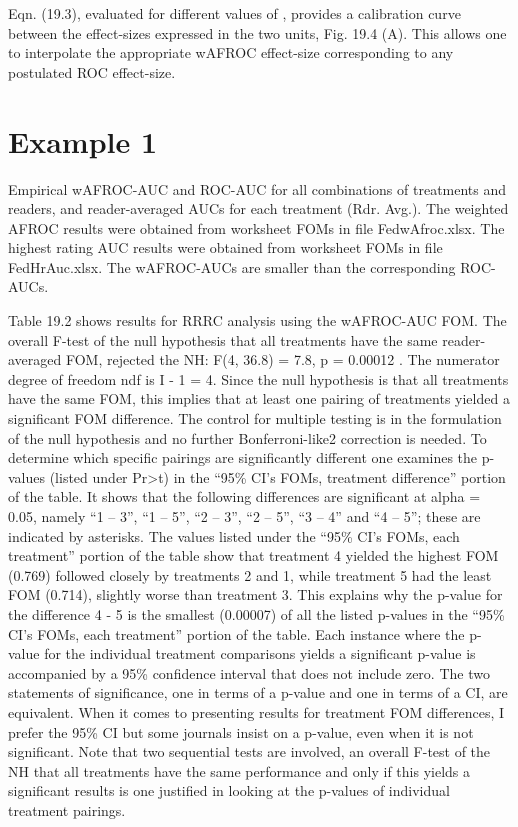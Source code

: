 \documentclass[
]{book}
\begin{document}
Eqn. (19.3), evaluated for different values of , provides a calibration curve between the effect-sizes expressed in the two units, Fig. 19.4 (A). This allows one to interpolate the appropriate wAFROC effect-size corresponding to any postulated ROC effect-size.

\hypertarget{froc-sample-size-example1}{%
\section{Example 1}\label{froc-sample-size-example1}}

Empirical wAFROC-AUC and ROC-AUC for all combinations of treatments and readers, and reader-averaged AUCs for each treatment (Rdr. Avg.). The weighted AFROC results were obtained from worksheet FOMs in file FedwAfroc.xlsx. The highest rating AUC results were obtained from worksheet FOMs in file FedHrAuc.xlsx. The wAFROC-AUCs are smaller than the corresponding ROC-AUCs.

Table 19.2 shows results for RRRC analysis using the wAFROC-AUC FOM. The overall F-test of the null hypothesis that all treatments have the same reader-averaged FOM, rejected the NH: F(4, 36.8) = 7.8, p = 0.00012 . The numerator degree of freedom ndf is I - 1 = 4. Since the null hypothesis is that all treatments have the same FOM, this implies that at least one pairing of treatments yielded a significant FOM difference. The control for multiple testing is in the formulation of the null hypothesis and no further Bonferroni-like2 correction is needed. To determine which specific pairings are significantly different one examines the p-values (listed under Pr\textgreater t) in the ``95\% CI's FOMs, treatment difference'' portion of the table. It shows that the following differences are significant at alpha = 0.05, namely ``1 -- 3'', ``1 -- 5'', ``2 -- 3'', ``2 -- 5'', ``3 -- 4'' and ``4 -- 5''; these are indicated by asterisks. The values listed under the ``95\% CI's FOMs, each treatment'' portion of the table show that treatment 4 yielded the highest FOM (0.769) followed closely by treatments 2 and 1, while treatment 5 had the least FOM (0.714), slightly worse than treatment 3. This explains why the p-value for the difference 4 - 5 is the smallest (0.00007) of all the listed p-values in the ``95\% CI's FOMs, each treatment'' portion of the table. Each instance where the p-value for the individual treatment comparisons yields a significant p-value is accompanied by a 95\% confidence interval that does not include zero. The two statements of significance, one in terms of a p-value and one in terms of a CI, are equivalent. When it comes to presenting results for treatment FOM differences, I prefer the 95\% CI but some journals insist on a p-value, even when it is not significant. Note that two sequential tests are involved, an overall F-test of the NH that all treatments have the same performance and only if this yields a significant results is one justified in looking at the p-values of individual treatment pairings.
\end{document}

